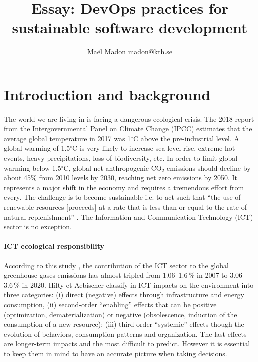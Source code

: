 \documentclass[11pt,twocolumn]{article}
\title{
    Essay: DevOps practices for sustainable software development
}
\author{
    Maël Madon \href{mailto:madon@kth.se}{madon@kth.se}
}
\begin{document}
\maketitle
{}


\section{Introduction and background}
\paragraph{}
The world we are living in is facing a dangerous ecological crisis. The 2018 report from the Intergovernmental Panel on Climate Change (IPCC) \cite{masson-delmotteGlobalWarming5C2018} estimates that the average global temperature in 2017 was 1$^\circ$C above the pre-industrial level. A global warming of 1.5$^\circ$C is very likely to increase sea level rise, extreme hot events, heavy precipitations, loss of biodiversity, etc. In order to limit global warming below 1.5$^\circ$C, global net anthropogenic CO$_2$ emissions should decline by about 45\% from 2010 levels by 2030, reaching net zero emissions by 2050. It represents a major shift in the economy and requires a tremendous effort from every. The challenge is to become sustainable i.e. to act such that ``the use of renewable resources [proceeds] at a rate that is less than or equal to the rate of natural replenishment'' \cite{heinbergWhatSustainability2010}. The Information and Communication Technology (ICT) sector is no exception.

\paragraph{ICT ecological responsibility}
According to this study \cite{belkhirAssessingICTGlobal2018}, the contribution of the ICT sector to the global greenhouse gases emissions has almost tripled from 1.06--1.6\,\% in 2007 to 3.06--3.6\,\% in 2020. Hilty et Aebischer classify in \cite{hiltyIctSustainabilityEmerging2015} ICT impacts on the environment into three categories: (i) direct (negative) effects through infrastructure and energy consumption, (ii) second-order ``enabling'' effects that can be positive (optimization, dematerialization) or negative (obsolescence, induction of the consumption of a new resource); (iii) third-order ``systemic'' effects though the evolution of behaviors, consumption patterns and organization. The last effects are longer-term impacts and the most difficult to predict. However it is essential to keep them in mind to have an accurate picture when taking decisions.
\end{document}
